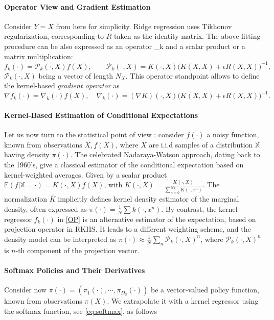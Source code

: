 \documentclass[
]{article}
\def\({}%
\def\){}%
\numberwithin{equation}{section}
\begin{document}
\paragraph*{Operator View and Gradient Estimation} Consider $Y=X$ from here for simplicity. Ridge regression uses Tikhonov regularization, corresponding to $R$ taken as the identity matrix. The above fitting procedure can be also
expressed as an operator \(_k\) and a scalar product or a matrix multiplication:
\begin{equation}\label{OP}
 f_{k}(\cdot) = \mathcal{P}_k(\cdot,X) f(X), \qquad \mathcal{P}_k(\cdot,X) =K(\cdot,X)\big( K(X,X) + \epsilon R(X,X) \big)^{-1},
\end{equation} 
$\mathcal{P}_k(\cdot,X)$ being a vector of length $N_X$. This operator standpoint allows to define the kernel-based
\textit{gradient operator} as \begin{equation}
\label{nabla}
 \nabla f_{k}(\cdot) = \nabla_k(\cdot) f(X), \quad \nabla_k(\cdot) = (\nabla K)(\cdot,X)\big( K(X,X) + \epsilon R(X,X) \big)^{-1}.
\end{equation}

\paragraph*{Kernel-Based Estimation of Conditional Expectations} Let us now turn to the statistical point of view : consider $f(\cdot)$ a noisy function, known from observations $X,f(X)$, where $X$ are i.i.d samples of a distribution $\mathbb{X}$ having density $\pi(\cdot)$. The celebrated Nadaraya-Watson approach, dating back to the 1960's, give a classical estimator of the conditional expectation based on kernel-weighted averages. Given by a scalar product
$\mathbb{E}(f | \mathbb{X} = \cdot)=\overline{K(\cdot,X)}f(X)$, with $\overline{K(\cdot,X)} = \frac{K(\cdot,X)}{\sum_{n=0}^{N_X} K(\cdot,x^n)}$. The normalization $\overline{K}$ implicitly defines kernel density estimator of the marginal density, often expressed as $\pi(\cdot) = \frac{1}{N}\sum k(\cdot,x^n)$. By contrast, the kernel regressor $f_k(\cdot)$ in \eqref{OP} is an alternative estimator of the expectation, based on projection operator in RKHS. It leads to a different weighting scheme, and the density model can be interpreted as $\pi(\cdot)\approx\frac{1}{N}\sum_n \mathcal{P}_k(\cdot,X)^n$, where $\mathcal{P}_k(\cdot,X)^n$ is $n$-th component of the projection vector.

\paragraph*{Softmax Policies and Their Derivatives} Consider now $\pi(\cdot)=(\pi_1(\cdot),\cdots, \pi_{D_\pi}(\cdot))$ be a vector-valued policy function, known from observations $\pi(X)$. We extrapolate it with a kernel regressor using the softmax function, see \eqref{eq:softmax}, as follows
\end{document}
